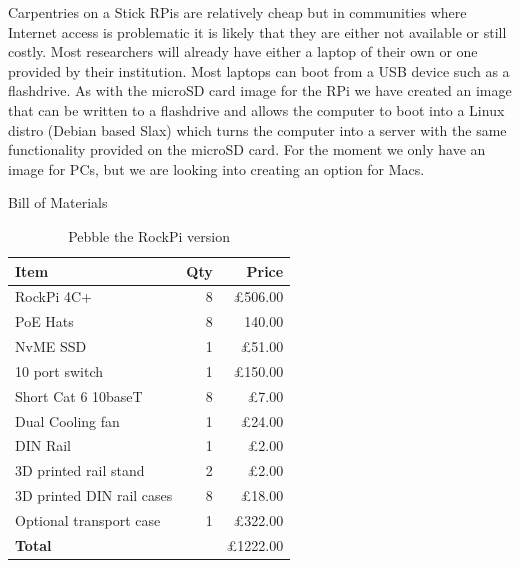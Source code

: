 \documentclass[final]{beamer}
\newlength{\colwidth}
\begin{document}
\begin{frame}[t]
\begin{columns}[t]
\begin{column}{\colwidth}
				\begin{alertblock}{Carpentries on a Stick}			
					RPis are relatively cheap but in communities where Internet access is problematic it is likely that they are either not available or still 
					costly. Most researchers will already have either a laptop of their own or one provided by their institution. Most laptops can boot from 
					a USB device such as a flashdrive. As with the microSD card image for the RPi we have created an image that can be written to a flashdrive 
					and allows the computer to boot into a Linux distro (Debian based Slax) which turns the computer into a server with the same functionality 
					provided on the microSD card. For the moment we only have an image for PCs, but we are looking into creating an option for Macs.
					\break
					\break
					\break
					
				\end{alertblock}
				
				\begin{block}{Bill of Materials}
					\begin{table}
					\parbox{.45\linewidth}{
						\centering
						\caption{Pebble the RockPi version}				
						\begin{tabular}{l|r|r}
							\textbf{Item} & \textbf{Qty} & \textbf{Price} \\
							\hline
							RockPi 4C+ & 8 & £506.00\\
							PoE Hats & 8 & 140.00 \\
							NvME SSD & 1 & £51.00 \\
							10 port switch & 1 & £150.00 \\
							Short Cat 6 10baseT & 8 & £7.00\\
							Dual Cooling fan & 1 & £24.00 \\
							DIN Rail & 1 & £2.00 \\
							3D printed rail stand & 2 & £2.00 \\
							3D printed DIN rail cases & 8 & £18.00 \\
							Optional transport case & 1 & £322.00 \\
							\hline
							\textbf{Total} &  & £1222.00 \\
						\end{tabular}
					}
					\end{table}
				\end{block}

			\end{column}
			

\end{columns}
\end{frame}
\end{document}
